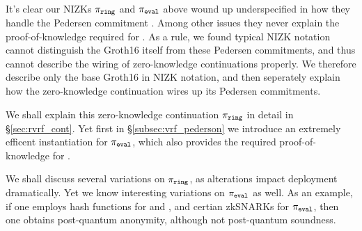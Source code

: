 It's clear our NIZKs $\pi_{\mathtt{ring}}$ and $\pi_{\mathtt{eval}}$ above wound up underspecified
in how they handle the Pedersen commitment \compk.  Among other issues
they never explain the proof-of-knowledge required for \compk.
As a rule, we found typical NIZK notation cannot distinguish the Groth16
itself from these Pedersen commitments, and thus cannot describe the
wiring of zero-knowledge continuations properly.
We therefore describe only the base Groth16 in NIZK notation, and then
seperately explain how the zero-knowledge continuation wires up its
Pedersen commitments.

We shall explain this zero-knowledge continuation $\pi_{\mathtt{ring}}$ in detail
in \S\ref{sec:rvrf_cont}.  Yet first in \S\ref{subsec:vrf_pederson}
we introduce an extremely efficent instantiation for $\pi_{\mathtt{eval}}$, which
also provides the required proof-of-knowledge for \compk.

We shall discuss several variations on $\pi_{\mathtt{ring}}$, as alterations impact
deployment dramatically.  Yet we know interesting variations on $\pi_{\mathtt{eval}}$
as well.  As an example, if one employs hash functions for \CommitKey
and \PRF, and certian zkSNARKs for $\pi_{\mathtt{eval}}$, then one obtains post-quantum
anonymity, although not post-quantum soundness.

